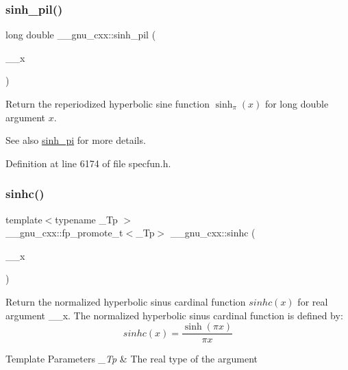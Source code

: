 \subsubsection{\texorpdfstring{sinh\+\_\+pil()}{sinh\_pil()}}
{\footnotesize\ttfamily long double \+\_\+\+\_\+gnu\+\_\+cxx\+::sinh\+\_\+pil (\begin{DoxyParamCaption}\item[{long double}]{\+\_\+\+\_\+x }\end{DoxyParamCaption})\hspace{0.3cm}{\ttfamily [inline]}}

Return the reperiodized hyperbolic sine function $ \sinh_\pi(x) $ for {\ttfamily long double} argument $ x $.

\begin{DoxySeeAlso}{See also}
\hyperlink{group__gnu__math__spec__func_gade43453b87b6b38c05b3fcce40870542}{sinh\+\_\+pi} for more details. 
\end{DoxySeeAlso}


Definition at line 6174 of file specfun.\+h.

\mbox{\label{group__gnu__math__spec__func_gaf2f02e4143e7beb97352cef4b7fcb663}} 
\subsubsection{\texorpdfstring{sinhc()}{sinhc()}}
{\footnotesize\ttfamily template$<$typename \+\_\+\+Tp $>$ \\
\+\_\+\+\_\+gnu\+\_\+cxx\+::fp\+\_\+promote\+\_\+t$<$\+\_\+\+Tp$>$ \+\_\+\+\_\+gnu\+\_\+cxx\+::sinhc (\begin{DoxyParamCaption}\item[{\+\_\+\+Tp}]{\+\_\+\+\_\+x }\end{DoxyParamCaption})\hspace{0.3cm}{\ttfamily [inline]}}

Return the normalized hyperbolic sinus cardinal function $ sinhc(x) $ for real argument {\ttfamily \+\_\+\+\_\+x}. The normalized hyperbolic sinus cardinal function is defined by\+: \[ sinhc(x) = \frac{\sinh(\pi x)}{\pi x} \]


\begin{DoxyTemplParams}{Template Parameters}
{\em \+\_\+\+Tp} & The real type of the argument \\
\hline
\end{DoxyTemplParams}

